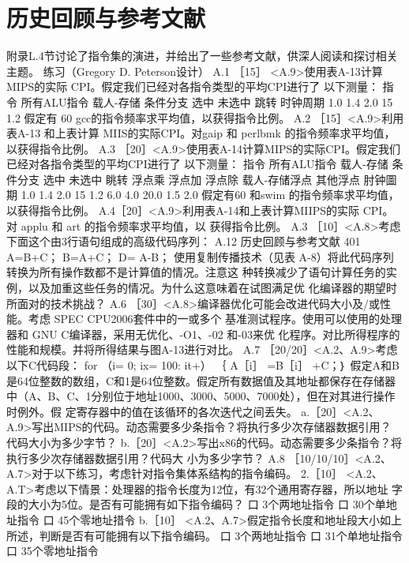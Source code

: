 \section{历史回顾与参考文献}
附录L.4节讨论了指令集的演进，并给出了一些参考文献，供深人阅读和探讨相关主题。
练习（Gregory D. Peterson设计）
A.1 ［15］ <A.9>使用表A-13计算 MIPS的实际 CPI。假定我们已经对各指令类型的平均CPI进行了
以下测量：
指令
所有ALU指令
载人-存储
条件分支
选中
未选中
跳转
时钟周期
1.0
1.4
2.0
15
1.2
假定有 60%
gcc的指令频率求平均值，以获得指令比例。
A.2 ［15］<A.9>利用表A-13 和上表计算 MIIS的实际CPI。对gaip 和 perlbmk 的指令频率求平均值，
以获得指令比例。
A.3 ［20］<A.9>使用表A-14计算MIPS的实际CPI。假定我们已经对各指令类型的平均CPI进行了
以下测量：
指令
所有ALU指令
载人-存储
条件分支
选中
未选中
眺转
浮点乘
浮点加
浮点除
载人-存储浮点
其他浮点
肘钟圖期
1.0
1.4
2.0
15
1.2
6.0
4.0
20.0
1.5
2.0
假定有60%
和swim 的指令频率求平均值，以获得指令比例。
A.4［20］<A.9>利用表A-14和上表计算MIIPS的实际 CPI。对 applu 和 art 的指令频率求平均值，以
获得指令比例。
A.3 ［10］<A.8>考虑下面这个由3行语句组成的高级代码序列：
A.12 历史回顾与参考文献
401
A=B+C；
B=A+C；
D= A-B；
使用复制传播技术（见表 A-8）将此代码序列转换为所有操作数都不是计算值的情况。注意这
种转换减少了语句计算任务的实例，以及加重这些任务的情况。为什么这意味着在试图满足优
化编译器的期望时所面对的技术挑战？
A.6
［30］<A.8>编译器优化可能会改进代码大小及/或性能。考虑 SPEC CPU2006套件中的一或多个
基准测试程序。使用可以使用的处理器和 GNU C编译器，采用无优化、-O1、-02 和-03来优
化程序。对比所得程序的性能和规模。并将所得结果与图A-13进行对比。
A.7 ［20/20］<A.2、A.9>考虑以下C代码段：
for （i= 0; ix= 100: it+）
｛ A［i］ =B［i］ +C；｝
假定A和B是64位整数的数组，C和1是64位整数。假定所有数据值及其地址都保存在存储器
中（A、B、C、1分别位于地址1000、3000、5000、7000处），但在对其进行操作时例外。假
定寄存器中的值在该循环的各次迭代之间丢失。
a.［20］<A.2、A.9>写出MIPS的代码。动态需要多少条指令？将执行多少次存储器数据引用？
代码大小为多少字节？
b.［20］<A.2>写出x86的代码。动态需要多少条指令？将执行多少次存储器数据引用？代码大
小为多少字节？
A.8 ［10/10/10］<A.2、A.7>对于以下练习，考虑针对指令集体系结构的指令编码。
2.［10］ <A.2、A.T>考虑以下情景：处理器的指令长度为12位，有32个通用寄存器，所以地址
字段的大小为5位。是否有可能拥有如下指令编码？
口 3个两地址指令
口 30个单地址指令
口 45个零地址措令
b.［10］ <A.2、A.7>假定指令长度和地址段大小如上所述，判断是否有可能拥有以下指令编码。
口 3个两地址指令
口 31个单地址指令
口 35个零地址指令
